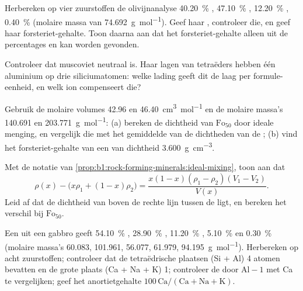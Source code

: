 \begin{exercise}[$\star\star$]\label{exo:b1:rock-forming-minerals:7}
Herbereken op vier zuurstoffen de olivijnanalyse \qty{40.20}{\percent} , \qty{47.10}{\percent} , \qty{12.20}{\percent} ,
\qty{0.40}{\percent}  (molaire massa van  \qty{74.692}{g.mol^{-1}}). Geef haar , controleer die, en geef
haar forsteriet-gehalte. Toon daarna aan dat het forsteriet-gehalte alleen uit de percentages  en  kan worden gevonden.
\end{exercise}

\begin{exercise}[$\star\star$]\label{exo:b1:rock-forming-minerals:8}
Controleer dat muscoviet  neutraal is. Haar lagen van tetraëders hebben één aluminium op drie siliciumatomen: welke
lading geeft dit de laag per formule-eenheid, en welk ion compenseert die?
\end{exercise}

\begin{exercise}[$\star\star$]\label{exo:b1:rock-forming-minerals:9}
Gebruik de molaire volumes \num{42.96} en \qty{46.40}{cm^3.mol^{-1}} en de molaire massa's \num{140.691} en \qty{203.771}{g.mol^{-1}}:
(a) bereken de dichtheid van $\text{Fo}_{50}$ door ideale menging, en vergelijk die met het gemiddelde van de dichtheden van de ;
(b) vind het forsteriet-gehalte van een  van dichtheid \qty{3.600}{g.cm^{-3}}.
\end{exercise}

\begin{exercise}[$\star\star\star$]\label{exo:b1:rock-forming-minerals:10}
Met de notatie van \cref{prop:b1:rock-forming-minerals:ideal-mixing}, toon aan dat
\[
  \rho(x) - \bigl(x\rho_1 + (1 - x)\rho_2\bigr) =
  \frac{x(1 - x)(\rho_1 - \rho_2)(V_1 - V_2)}{V(x)} .
\]
Leid af dat de dichtheid van  boven de rechte lijn tussen de  ligt, en bereken het verschil bij $\text{Fo}_{50}$.
\end{exercise}

\begin{exercise}[$\star\star\star$]\label{exo:b1:rock-forming-minerals:11}
Een  uit een gabbro geeft \qty{54.10}{\percent} , \qty{28.90}{\percent} , \qty{11.20}{\percent} ,
\qty{5.10}{\percent}  en \qty{0.30}{\percent}  (molaire massa's \num{60.083}, \num{101.961}, \num{56.077}, \num{61.979},
\qty{94.195}{g.mol^{-1}}). Herbereken op acht zuurstoffen; controleer dat de tetraëdrische plaatsen (Si + Al) 4 atomen bevatten en de grote
plaats (Ca + Na + K) 1; controleer de  door $\mathrm{Al} - 1$ met Ca te vergelijken; geef het anortietgehalte
$100\,\mathrm{Ca}/(\mathrm{Ca} +
\mathrm{Na} + \mathrm{K})$.
\end{exercise}

